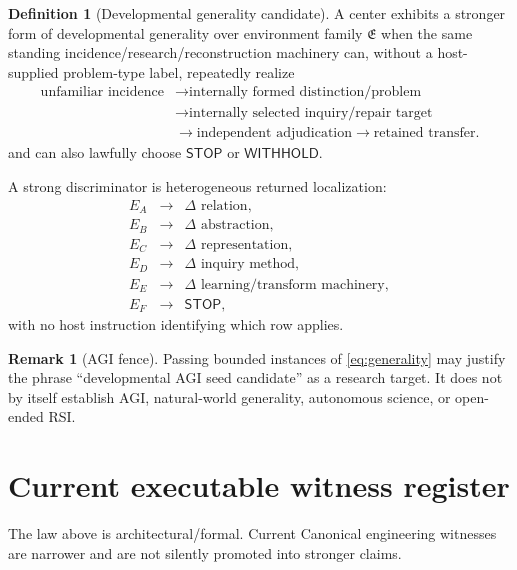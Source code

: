 \documentclass[10pt]{article}
\theoremstyle{venus}
\theoremstyle{definition}
\newtheorem{definition}[theorem]{Definition}
\newtheorem{remark}[theorem]{Remark}
\newcommand{\Withhold}{\mathsf{WITHHOLD}}
\newcommand{\Stop}{\mathsf{STOP}}
\begin{document}
\begin{definition}[Developmental generality candidate]
A center exhibits a stronger form of developmental generality over environment
family $\mathfrak E$ when the same standing incidence/research/reconstruction
machinery can, without a host-supplied problem-type label, repeatedly realize
\begin{equation}\label{eq:generality}
\begin{aligned}
\text{unfamiliar incidence}
&\to\text{internally formed distinction/problem}\\
&\to\text{internally selected inquiry/repair target}\\
&\to\text{independent adjudication}
\to\text{retained transfer}.
\end{aligned}
\end{equation}
and can also lawfully choose $\Stop$ or $\Withhold$.
\end{definition}

A strong discriminator is heterogeneous returned localization:
\[
\begin{array}{ccl}
E_A&\to&\Delta\text{ relation},\\
E_B&\to&\Delta\text{ abstraction},\\
E_C&\to&\Delta\text{ representation},\\
E_D&\to&\Delta\text{ inquiry method},\\
E_E&\to&\Delta\text{ learning/transform machinery},\\
E_F&\to&\Stop,
\end{array}
\]
with no host instruction identifying which row applies.

\begin{remark}[AGI fence]
Passing bounded instances of \eqref{eq:generality} may justify the phrase
``developmental AGI seed candidate'' as a research target. It does not by itself
establish AGI, natural-world generality, autonomous science, or open-ended RSI.
\end{remark}

\section{Current executable witness register}

The law above is architectural/formal. Current Canonical engineering witnesses
are narrower and are not silently promoted into stronger claims.
\end{document}
